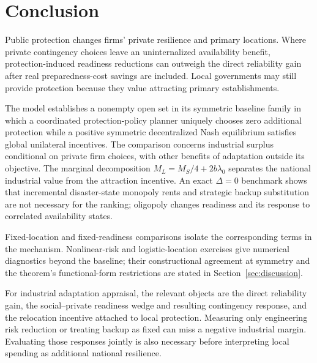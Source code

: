\section{Conclusion}\label{sec:conclusion}

Public protection changes firms' private resilience and primary locations. Where private contingency choices leave an uninternalized availability benefit, protection-induced readiness reductions can outweigh the direct reliability gain after real preparedness-cost savings are included. Local governments may still provide protection because they value attracting primary establishments.

The model establishes a nonempty open set in its symmetric baseline family in which a coordinated protection-policy planner uniquely chooses zero additional protection while a positive symmetric decentralized Nash equilibrium satisfies global unilateral incentives. The comparison concerns industrial surplus conditional on private firm choices, with other benefits of adaptation outside its objective. The marginal decomposition $M_L=M_S/4+2b\lambda_0$ separates the national industrial value from the attraction incentive. An exact $\Delta=0$ benchmark shows that incremental disaster-state monopoly rents and strategic backup substitution are not necessary for the ranking; oligopoly changes readiness and its response to correlated availability states.

Fixed-location and fixed-readiness comparisons isolate the corresponding terms in the mechanism. Nonlinear-risk and logistic-location exercises give numerical diagnostics beyond the baseline; their constructional agreement at symmetry and the theorem's functional-form restrictions are stated in Section~\ref{sec:discussion}.

For industrial adaptation appraisal, the relevant objects are the direct reliability gain, the social--private readiness wedge and resulting contingency response, and the relocation incentive attached to local protection. Measuring only engineering risk reduction or treating backup as fixed can miss a negative industrial margin. Evaluating those responses jointly is also necessary before interpreting local spending as additional national resilience.
